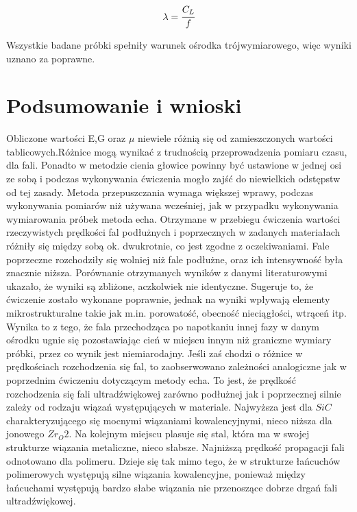 \documentclass[a4paper,12pt]{article}
\begin{document}
$$\lambda=\cfrac{C_L}{f}$$



Wszystkie badane próbki spełniły warunek ośrodka trójwymiarowego, więc wyniki uznano za poprawne.



\section{Podsumowanie i wnioski}
Obliczone wartości E,G oraz $\mu$ niewiele różnią się od zamieszczonych wartości tablicowych.Różnice mogą wynikać z trudnością przeprowadzenia  pomiaru czasu, dla fali. Ponadto w metodzie cienia głowice powinny być ustawione w jednej osi ze sobą i podczas wykonywania ćwiczenia mogło zajść do niewielkich odstępstw od tej zasady. Metoda przepuszczania wymaga większej wprawy, podczas wykonywania pomiarów niż używana wcześniej, jak w przypadku wykonywania wymiarowania próbek metoda echa.
Otrzymane w przebiegu ćwiczenia wartości rzeczywistych   prędkości fal podłużnych i poprzecznych w zadanych materiałach różniły się między sobą ok. dwukrotnie, co jest zgodne z oczekiwaniami. Fale poprzeczne rozchodziły się wolniej niż fale podłużne, oraz ich intensywność była znacznie niższa. 
Porównanie otrzymanych wyników z danymi literaturowymi ukazało, że wyniki są zbliżone, aczkolwiek nie identyczne. Sugeruje to, że ćwiczenie zostało wykonane poprawnie, jednak na wyniki wpływają elementy mikrostrukturalne takie jak m.in. porowatość, obecność nieciągłości, wtrąceń itp. Wynika to z tego, że fala przechodząca po napotkaniu innej fazy w danym ośrodku ugnie się pozostawiając cień w miejscu innym niż graniczne wymiary próbki, przez co wynik jest niemiarodajny. 
Jeśli zaś chodzi o różnice w prędkościach rozchodzenia się fal, to zaobserwowano zależności analogiczne jak w poprzednim ćwiczeniu dotyczącym metody echa. To jest, że prędkość rozchodzenia się fali ultradźwiękowej zarówno podłużnej jak i poprzecznej silnie zależy od rodzaju wiązań występujących w materiale. Najwyższa jest dla $SiC$ charakteryzującego się mocnymi wiązaniami kowalencyjnymi, nieco niższa dla jonowego  $Zr_O2$. Na kolejnym miejscu plasuje się stal, która ma w swojej strukturze wiązania metaliczne, nieco słabsze. Najniższą prędkość propagacji fali odnotowano dla polimeru. Dzieje się tak mimo tego, że w strukturze łańcuchów polimerowych występują silne wiązania kowalencyjne, ponieważ między łańcuchami występują bardzo słabe wiązania nie przenoszące dobrze drgań fali ultradźwiękowej.
\end{document}
